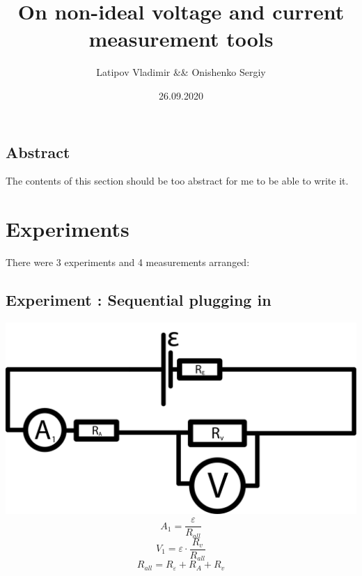 \documentclass[12pt]{memoir}
\title{\textbf{\Huge{On non-ideal voltage and current measurement tools}}}
\date{26.09.2020}
\author{Latipov Vladimir \&\& Onishenko Sergiy}
\begin{document}
    \renewcommand{\thesection}{\arabic{section}}

    \maketitle
    \newpage

    \tableofcontents

    \newpage


    \begin{vplace}
    \begin{center}

    \section{Abstract}\label{sec:abstract}
    The contents of this section should be too abstract for me to be able to write it.

    \end{center}
    \end{vplace}

    \newpage

    \section{Experiments}\label{sec:experiments}
    There were 3 experiments and 4 measurements arranged:

    \subsection{Experiment : Sequential plugging in}\label{subsec:experiment-1} %
    \includegraphics[width=\linewidth]{images/schemes/Sequential.png}
    \begin{equation*}
        A_1 = \frac{\varepsilon}{R_{all}}
    \end{equation*}
    \begin{equation*}
        V_1 = \varepsilon \cdot \frac{R_v}{R_{all}}
    \end{equation*}
    \begin{equation*}
        R_{all} = R_\varepsilon + R_A + R_v
    \end{equation*}
\end{document}
